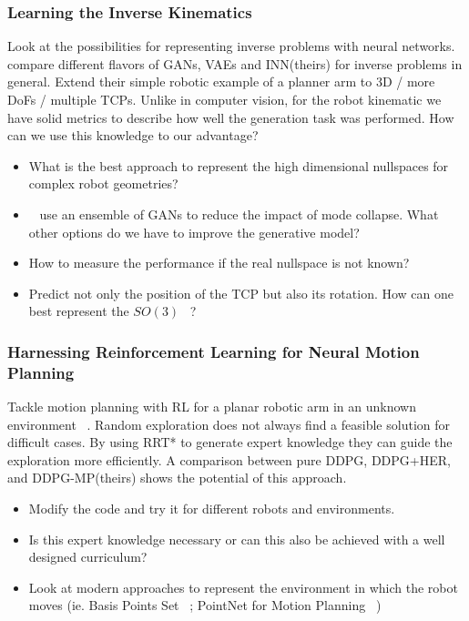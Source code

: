 \documentclass[a4paper]{article}
\begin{document}
\subsubsection{Learning the Inverse Kinematics}
Look at the possibilities for representing inverse problems with neural networks.
~\cite{Ardizzone2018} compare different flavors of GANs, VAEs and INN(theirs) for inverse problems in general.
Extend their simple robotic example of a planner arm to 3D / more DoFs / multiple TCPs.
Unlike in computer vision, for the robot kinematic we have solid metrics to describe how well the generation task was performed.
How can we use this knowledge to our advantage?

\begin{itemize}
  \item What is the best approach to represent the high dimensional nullspaces for complex robot geometries?
  \item ~\cite{Lembono2021} use an ensemble of GANs to reduce the impact of mode collapse.
        What other options do we have to improve the generative model?
  \item How to measure the performance if the real nullspace is not known?
  \item Predict not only the position of the TCP but also its rotation.
        How can one best represent the $SO(3)$ ~\cite{Zhou2018}?
\end{itemize}

\subsubsection{Harnessing Reinforcement Learning for Neural Motion Planning}
Tackle motion planning with RL for a planar robotic arm in an unknown environment ~\cite{Jurgenson2019}.
Random exploration does not always find a feasible solution for difficult cases. 
By using RRT* to generate expert knowledge they can guide the exploration more efficiently.
A comparison between pure DDPG, DDPG+HER, and DDPG-MP(theirs) shows the potential of this approach.


\begin{itemize}
  \item Modify the code and try it for different robots and environments.
  \item Is this expert knowledge necessary or can this also be achieved with a well designed curriculum?
  \item Look at modern approaches to represent the environment in which the robot moves (ie. Basis Points Set ~\cite{Prokudin2019}; PointNet for Motion Planning ~\cite{Strudel2020})
\end{itemize}
\end{document}
